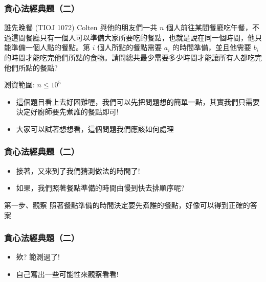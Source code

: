 \documentclass[aspectratio=169]{beamer}
\begin{document}
\begin{frame}
\frametitle{貪心法經典題（二）}
    \begin{block}{誰先晚餐 (TIOJ 1072)}
        Colten 與他的朋友們一共 $n$ 個人前往某間餐廳吃午餐，不過這間餐廳只有一個人可以準備大家所要吃的餐點，也就是說在同一個時間，他只能準備一個人點的餐點。第 $i$ 個人所點的餐點需要 $a_i$ 的時間準備，並且他需要 $b_i$ 的時間才能吃完他們所點的食物。請問總共最少需要多少時間才能讓所有人都吃完他們所點的餐點?
        
        測資範圍: $n \le 10^5$
    \end{block}
    \begin{itemize}
        \item<2-> 這個題目看上去好困難喔，我們可以先把問題想的簡單一點，其實我們只需要決定好廚師要先煮誰的餐點即可!
        \item<3-> 大家可以試著想想看，這個問題我們應該如何處理
    \end{itemize}
\end{frame}

\begin{frame}
\frametitle{貪心法經典題（二）}
    \begin{itemize}
        \item<1-> 接著，又來到了我們猜測做法的時間了! \pause
        \item<2-> 如果，我們照著餐點準備的時間由慢到快去排順序呢? \pause
    \end{itemize}
    
    \begin{alertblock}{第一步、觀察}
        照著餐點準備的時間決定要先煮誰的餐點，好像可以得到正確的答案 
    \end{alertblock}
\end{frame}

\begin{frame}
\frametitle{貪心法經典題（二）}
    \begin{itemize}
        \item<1-> 欸? 範測過了!
        \item<2-> 自己寫出一些可能性來觀察看看!
    \end{itemize}
\end{frame}
\end{document}
